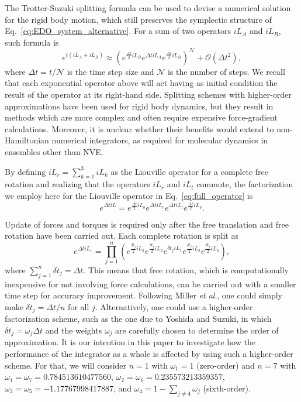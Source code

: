 \documentclass[aip,jcp,reprint,amsmath,amssymb,raggedbottom]{revtex4-1}
\begin{document}
The Trotter-Suzuki splitting formula\cite{Trotter1959, Suzuki1976} can be used to devise a numerical solution for the rigid body motion, which still preserves the symplectic structure of Eq.~\ref{eq:EDO_system_alternative}. For a sum of two operators $i\!L_A$ and $i\!L_B$, such formula is
\[
e^{t(i\!L_A + i\!L_B)} \approx \left( e^{\frac{\Delta t}{2} i\!L_B} e^{\Delta t i\!L_A} e^{\frac{\Delta t}{2} i\!L_B} \right)^\mathcal{N} + \mathcal{O}(\Delta t^2),
\]
where $\Delta t = t/\mathcal N$ is the time step size and $\mathcal N$ is the number of steps. We recall that each exponential operator above will act having as initial condition the result of the operator at its right-hand side. Splitting schemes with higher-order approximations have been used for rigid body dynamics,\cite{Omelyan2007, Omelyan2008, vanZon2008} but they result in methods which are more complex and often require expensive force-gradient calculations. Moreover, it is unclear whether their benefits would extend to non-Hamiltonian numerical integrators, as required for molecular dynamics in ensembles other than NVE.

By defining $i\!L_r = \sum_{k=1}^3 i\!L_k$ as the Liouville operator for a complete free rotation and realizing that the operators $i\!L_r$ and $i\!L_t$ commute, the factorization we employ here for the Liouville operator in Eq.~\ref{eq:full_operator} is
\begin{equation}
\label{eq:trotter_splitting_NVE}
e^{\Delta t i\!L} = e^{\frac{\Delta t}{2} i\!L_b} e^{\Delta t i\!L_r} e^{\Delta t i\!L_t} e^{\frac{\Delta t}{2} i\!L_b}.
\end{equation}

Update of forces and torques is required only after the free translation and free rotation have been carried out. Each complete rotation is split as\cite{Miller2002}
\begin{equation}
\label{eq:splitting_rot}
e^{\Delta t i\!L_r} = \prod_{j=1}^n \left( e^{\frac{\delta t_j}{2} i\!L_3} e^{\frac{\delta t_j}{2} i\!L_2} e^{\delta t_j i\!L_1} e^{\frac{\delta t_j}{2} i\!L_2} e^{\frac{\delta t_j}{2} i\!L_3} \right),
\end{equation}
where $\sum_{j=1}^n {\delta t}_j = \Delta t$. This means that free rotation, which is computationally inexpensive for not involving force calculations, can be carried out with a smaller time step for accuracy improvement. Following Miller \textit{et al}.,\cite{Miller2002} one could simply make $\delta t_j = \Delta t/n$ for all $j$. Alternatively, one could use a higher-order factorization scheme, such as the one due to Yoshida\cite{Yoshida1990} and Suzuki,\cite{Suzuki1991a, Suzuki1991b} in which $\delta t_j = \omega_j \Delta t$ and the weights $\omega_j$ are carefully chosen to determine the order of approximation. It is our intention in this paper to investigate how the performance of the integrator as a whole is affected by using such a higher-order scheme. For that, we will consider $n = 1$ with $\omega_1 = 1$ (zero-order) and $n = 7$ with $\omega_1 = \omega_7 = 0.784513610477560$, $\omega_2 = \omega_6 = 0.235573213359357$, $\omega_3 = \omega_5 = -1.17767998417887$, and $\omega_4 = 1 - \sum_{j \neq 4} \omega_j$ (sixth-order).
\end{document}
